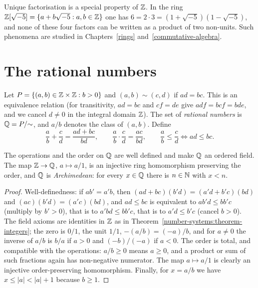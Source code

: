 \begin{remark}\label{number-systems:remark-unique-factorisation-fails}
Unique factorisation is a special property of $\mathbb{Z}$. In the ring
$\mathbb{Z}[\sqrt{-5}] = \{a + b\sqrt{-5} : a, b \in \mathbb{Z}\}$ one has
$6 = 2 \cdot 3 = (1 + \sqrt{-5})(1 - \sqrt{-5})$, and none of these four factors
can be written as a product of two non-units. Such phenomena are studied in
Chapters~\ref{rings} and~\ref{commutative-algebra}.
\end{remark}

\section{The rational numbers}\label{number-systems:section-rationals}

\begin{definition}\label{number-systems:definition-rationals}
Let $P = \{(a, b) \in \mathbb{Z} \times \mathbb{Z} : b > 0\}$ and $(a, b) \sim (c, d)$ if
$ad = bc$. This is an equivalence relation (for transitivity, $ad = bc$ and
$cf = de$ give $adf = bcf = bde$, and we cancel $d \neq 0$ in the integral domain
$\mathbb{Z}$). The set of \emph{rational numbers} is $\mathbb{Q} = P/{\sim}$, and $a/b$ denotes
the class of $(a, b)$. Define
\[
\frac{a}{b} + \frac{c}{d} = \frac{ad + bc}{bd}, \qquad
\frac{a}{b} \cdot \frac{c}{d} = \frac{ac}{bd}, \qquad
\frac{a}{b} \leq \frac{c}{d} \iff ad \leq bc.
\]
\end{definition}

\begin{theorem}\label{number-systems:theorem-rationals}
The operations and the order on $\mathbb{Q}$ are well defined and make $\mathbb{Q}$ an ordered
field. The map $\mathbb{Z} \to \mathbb{Q}$, $a \mapsto a/1$, is an injective ring homomorphism
preserving the order, and $\mathbb{Q}$ is \emph{Archimedean}: for every $x \in \mathbb{Q}$
there is $n \in \mathbb{N}$ with $x < n$.
\end{theorem}

\begin{proof}
Well-definedness: if $ab' = a'b$, then
$(ad + bc)(b'd) = (a'd + b'c)(bd)$ and $(ac)(b'd) = (a'c)(bd)$, and $ad \leq bc$
is equivalent to $ab'd \leq bb'c$ (multiply by $b' > 0$), that is to
$a'bd \leq bb'c$, that is to $a'd \leq b'c$ (cancel $b > 0$). The field axioms
are identities in $\mathbb{Z}$ as in Theorem~\ref{number-systems:theorem-integers};
the zero is $0/1$, the unit $1/1$, $-(a/b) = (-a)/b$, and for $a \neq 0$ the
inverse of $a/b$ is $b/a$ if $a > 0$ and $(-b)/(-a)$ if $a < 0$. The order is
total, and compatible with the operations: $a/b \geq 0$ means $a \geq 0$, and a
product or sum of such fractions again has non-negative numerator. The map
$a \mapsto a/1$ is clearly an injective order-preserving homomorphism. Finally,
for $x = a/b$ we have $x \leq |a| < |a| + 1$ because $b \geq 1$.
\end{proof}

